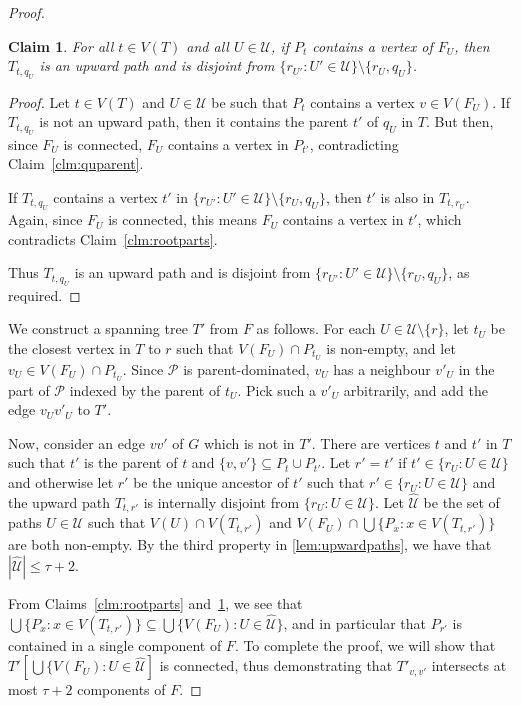 \documentclass[11pt]{article}
\renewcommand{\leq}{\leqslant}
\theoremstyle{plain}
\newtheorem{claim}{Claim}[thm]
\theoremstyle{definition}
\newcommand{\PP}{\mathcal{P}}
\begin{document}
\begin{proof}
			\begin{claim}\label{clm:central}
				For all $t\in V(T)$ and all $U\in \mathcal{U}$, if $P_t$ contains a vertex of $F_U$, then $T_{t, q_U}$ is an upward path and is disjoint from $\{r_{U'}:U'\in \mathcal{U}\}\setminus \{r_U,q_U\}$.
			\end{claim}
			\begin{proof}
				Let $t\in V(T)$ and $U\in \mathcal{U}$ be such that $P_t$ contains a vertex $v\in V(F_U)$.
				If $T_{t,q_U}$ is not an upward path, then it contains the parent $t'$ of $q_U$ in $T$.
				But then, since $F_U$ is connected, $F_U$ contains a vertex in $P_{t'}$, contradicting Claim~\ref{clm:quparent}.
				
				If $T_{t,q_U}$ contains a vertex $t'$ in $\{r_{U'}:U'\in \mathcal{U}\}\setminus \{r_U,q_U\}$, then $t'$ is also in $T_{t,r_U}$. 
				Again, since $F_U$ is connected, this means $F_U$ contains a vertex in $t'$, which contradicts Claim~\ref{clm:rootparts}.
				
				Thus $T_{t, q_U}$ is an upward path and is disjoint from $\{r_{U'}:U'\in \mathcal{U}\}\setminus \{r_U,q_U\}$, as required.
			\end{proof}
			
			We construct a spanning tree $T'$ from $F$ as follows.
			For each $U\in \mathcal{U}\setminus \{r\}$, let $t_U$ be the closest vertex in $T$ to $r$ such that $V(F_U)\cap P_{t_U}$ is non-empty, and let $v_U\in V(F_U)\cap P_{t_U}$.
			Since $\PP$ is parent-dominated, $v_U$ has a neighbour $v'_U$ in the part of $\PP$ indexed by the parent of $t_U$.
			Pick such a $v'_U$ arbitrarily, and add the edge $v_Uv'_U$ to $T'$.
			
			Now, consider an edge $vv'$ of $G$ which is not in $T'$.
			There are vertices $t$ and $t'$ in $T$ such that $t'$ is the parent of $t$ and $\{v,v'\}\subseteq P_t\cup P_{t'}$.
			Let $r'=t'$ if $t'\in \{r_U:U\in \mathcal{U}\}$ and otherwise let $r'$ be the unique ancestor of $t'$ such that $r'\in \{r_U:U\in \mathcal{U}\}$ and the upward path $T_{t,r'}$ is internally disjoint from $\{r_U:U\in \mathcal{U}\}$.
			Let $\hat{\mathcal{U}}$ be the set of paths $U\in \mathcal{U}$ such that $V(U)\cap V(T_{t,r'})$ and $V(F_U)\cap \bigcup \{P_x:x\in V(T_{t,r'})\}$ are both non-empty.
			By the third property in \cref{lem:upwardpaths}, we have that $|\hat{\mathcal{U}}|\leq \tau+2$.
			
			From Claims~\ref{clm:rootparts} and~\ref{clm:central}, we see that $\bigcup \{P_x:x\in V(T_{t,r'})\}\subseteq \bigcup \{V(F_U):U\in \hat{\mathcal{U}}\}$, and in particular that $P_{r'}$ is contained in a single component of $F$.
			To complete the proof, we will show that $T'[\bigcup \{V(F_U):U\in \hat{\mathcal{U}}]$ is connected, thus demonstrating that $T'_{v,v'}$ intersects at most $\tau+2$ components of $F$.
			

\end{proof}
\end{document}
